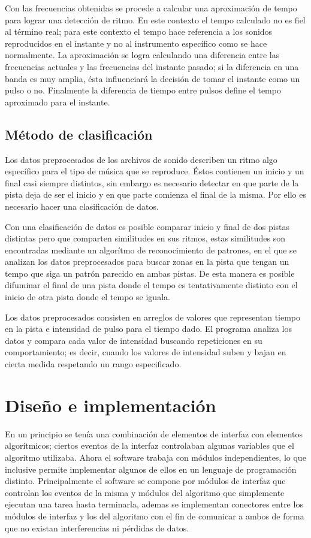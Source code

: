 \noindent Con las frecuencias obtenidas se procede a calcular una aproximaci\'on de tempo para lograr una detecci\'on de ritmo. En este contexto el tempo calculado no es fiel al t\'ermino real; para este contexto el tempo hace referencia a los sonidos reproducidos en el instante y no al instrumento espec\'ifico como se hace normalmente. La aproximaci\'on se logra calculando una diferencia entre las frecuencias actuales y las frecuencias del instante pasado; si la diferencia en una banda es muy amplia, \'esta influenciar\'a la decisi\'on de tomar el instante como un pulso o no. Finalmente la diferencia de tiempo entre pulsos define el tempo aproximado para el instante.

\subsection{M\'etodo de clasificaci\'on}

Los datos preprocesados de los archivos de sonido describen un ritmo algo espec\'ifico para el tipo de m\'usica que se reproduce. \'Estos contienen un inicio y un final casi siempre distintos, sin embargo es necesario detectar en que parte de la pista deja de ser el inicio y en que parte comienza el final de la misma. Por ello es necesario hacer una clasificaci\'on de datos.

\noindent Con una clasificaci\'on de datos es posible comparar inicio y final de dos pistas distintas pero que comparten similitudes en sus ritmos, estas similitudes son encontradas mediante un algor\'itmo de reconocimiento de patrones, en el que se analizan los datos preprocesados para buscar zonas en la pista que tengan un tempo que siga un patr\'on parecido en ambas pistas. De esta manera es posible difuminar el final de una pista donde el tempo es tentativamente distinto con el inicio de otra pista donde el tempo se iguala.

\noindent Los datos preprocesados consisten en arreglos de valores que representan tiempo en la pista e intensidad de pulso para el tiempo dado. El programa analiza los datos y compara cada valor de intensidad buscando repeticiones en su comportamiento; es decir, cuando los valores de intensidad suben y bajan en cierta medida respetando un rango especificado.

\section{Dise\~no e implementaci\'on}

En un principio se ten\'ia una combinaci\'on de elementos de interfaz con elementos algor\'itmicos; ciertos eventos de la interfaz controlaban algunas variables que el algoritmo utilizaba. Ahora el software trabaja con m\'odulos independientes, lo que inclusive permite implementar algunos de ellos en un lenguaje de programaci\'on distinto. Principalmente el software se compone por m\'odulos de interfaz que controlan los eventos de la misma y m\'odulos del algoritmo que simplemente ejecutan una tarea hasta terminarla, ademas se implementan conectores entre los m\'odulos de interfaz y los del algoritmo con el fin de comunicar a ambos de forma que no existan interferencias ni p\'erdidas de datos.

